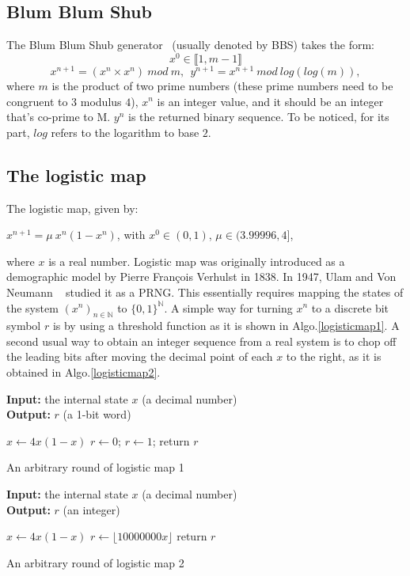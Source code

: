 \subsection{Blum Blum Shub}
The Blum Blum Shub generator~\cite{BBS} (usually denoted by BBS) takes the form:\\
$$x^0 \in \llbracket 1, m-1 \rrbracket$$
$$x^{n+1}=(x^n \times x^n) ~ mod~ m, ~~ y^{n+1} = x^{n+1}~ mod~ log(log(m)),$$  
where $m$ is the product of two prime numbers (these prime numbers  need to be congruent to $3$ modulus $4$), $x^n$ is an integer value, and it should be an integer that's co-prime to M. $y^n$ is the returned 
binary sequence. To be noticed, for its part, $log$ refers to the logarithm to base $2$.

\subsection{The logistic map}

The logistic map, given by:
\begin{center}
$x^{n+1}=\mu ~ x^{n}(1-x^{n})$, with $x^{0}\in(0,1)$, $\mu \in(3.99996,4]$,
\end{center}

\noindent where $x$ is a real number. Logistic map was originally introduced as a demographic model by Pierre Fran\c cois Verhulst in 1838. In 1947, Ulam and Von Neumann ~\cite{ulam1947} studied it as a PRNG. This essentially requires mapping the states of the system $\left(x^n\right)_{n \in \mathds{N}}$ to $\{0,1\}^\mathds{N}$. A simple way for turning $x^n$ to a discrete bit symbol $r$ is by using a threshold function as it is shown in Algo.\ref{logisticmap1}.
A second usual way to obtain an integer sequence from a real system is to chop off the leading bits after moving the decimal point of each $x$ to the right, as it is obtained in Algo.\ref{logisticmap2}.

\begin{algorithm}
\textbf{Input:} the internal state $x$ (a decimal number)\\
\textbf{Output:} $r$ (a 1-bit word)
\begin{algorithmic}[1]
\STATE$x\leftarrow{4x(1-x)}$
{
\STATE$r\leftarrow0$;	
}
\ELSE
{
\STATE$r\leftarrow1$;	
}\ENDIF
\STATE return $r$\;
\medskip
\caption{An arbitrary round of logistic map 1}
\label{logisticmap1}
\end{algorithmic}
\end{algorithm}

\begin{algorithm}
\textbf{Input:} the internal state $x$ (a decimal number)\\
\textbf{Output:} $r$ (an integer)
\begin{algorithmic}[1]
\STATE$x\leftarrow{4x(1-x)}$
\STATE$r\leftarrow{\lfloor10000000x\rfloor}$
\STATE return $r$\;
\medskip
\caption{An arbitrary round of logistic map 2}
\label{logisticmap2}
\end{algorithmic}
\end{algorithm}

